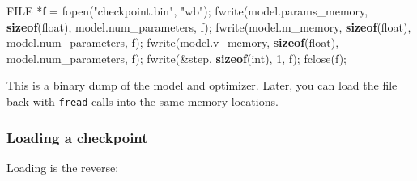 \documentclass[
  letterpaper,
  DIV=11,
  numbers=noendperiod]{scrreprt}
\newenvironment{Shaded}{\begin{snugshade}}{\end{snugshade}}
\newcommand{\DataTypeTok}[1]{\textcolor[rgb]{0.68,0.00,0.00}{#1}}
\newcommand{\DecValTok}[1]{\textcolor[rgb]{0.68,0.00,0.00}{#1}}
\newcommand{\KeywordTok}[1]{\textcolor[rgb]{0.00,0.23,0.31}{\textbf{#1}}}
\newcommand{\NormalTok}[1]{\textcolor[rgb]{0.00,0.23,0.31}{#1}}
\newcommand{\OperatorTok}[1]{\textcolor[rgb]{0.37,0.37,0.37}{#1}}
\newcommand{\StringTok}[1]{\textcolor[rgb]{0.13,0.47,0.30}{#1}}
\begin{document}
\begin{Shaded}
\begin{Highlighting}[]
\DataTypeTok{FILE} \OperatorTok{*}\NormalTok{f }\OperatorTok{=}\NormalTok{ fopen}\OperatorTok{(}\StringTok{"checkpoint.bin"}\OperatorTok{,} \StringTok{"wb"}\OperatorTok{);}
\NormalTok{fwrite}\OperatorTok{(}\NormalTok{model}\OperatorTok{.}\NormalTok{params\_memory}\OperatorTok{,} \KeywordTok{sizeof}\OperatorTok{(}\DataTypeTok{float}\OperatorTok{),}\NormalTok{ model}\OperatorTok{.}\NormalTok{num\_parameters}\OperatorTok{,}\NormalTok{ f}\OperatorTok{);}
\NormalTok{fwrite}\OperatorTok{(}\NormalTok{model}\OperatorTok{.}\NormalTok{m\_memory}\OperatorTok{,} \KeywordTok{sizeof}\OperatorTok{(}\DataTypeTok{float}\OperatorTok{),}\NormalTok{ model}\OperatorTok{.}\NormalTok{num\_parameters}\OperatorTok{,}\NormalTok{ f}\OperatorTok{);}
\NormalTok{fwrite}\OperatorTok{(}\NormalTok{model}\OperatorTok{.}\NormalTok{v\_memory}\OperatorTok{,} \KeywordTok{sizeof}\OperatorTok{(}\DataTypeTok{float}\OperatorTok{),}\NormalTok{ model}\OperatorTok{.}\NormalTok{num\_parameters}\OperatorTok{,}\NormalTok{ f}\OperatorTok{);}
\NormalTok{fwrite}\OperatorTok{(\&}\NormalTok{step}\OperatorTok{,} \KeywordTok{sizeof}\OperatorTok{(}\DataTypeTok{int}\OperatorTok{),} \DecValTok{1}\OperatorTok{,}\NormalTok{ f}\OperatorTok{);}
\NormalTok{fclose}\OperatorTok{(}\NormalTok{f}\OperatorTok{);}
\end{Highlighting}
\end{Shaded}

This is a binary dump of the model and optimizer. Later, you can load
the file back with \texttt{fread} calls into the same memory locations.

\subsubsection{Loading a checkpoint}\label{loading-a-checkpoint}

Loading is the reverse:
\end{document}
